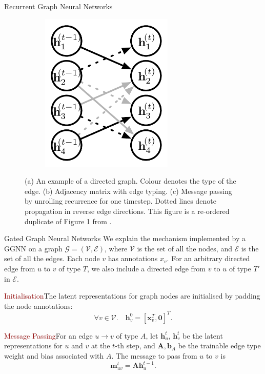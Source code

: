 \documentclass[final,hyperref={pdfpagelabels=false}]{beamer}
\begin{document}
\begin{frame}[t]
\begin{columns}[t]
\begin{column}{.3\textwidth}
\begin{block}{Recurrent Graph Neural Networks}
\begin{figure}
\begin{subfigure}{.25\textwidth}
          \includegraphics[height=3in]{imgs/unrolled-graph3.pdf}
          \caption{}
          \label{fig:sub2}
        \end{subfigure}
        
        \caption{(a) An example of a directed graph. Colour denotes the type of the edge. (b) Adjacency matrix with edge typing. (c) Message passing by unrolling recurrence for one timestep. Dotted lines denote propagation in reverse edge directions. This figure is a re-ordered duplicate of Figure 1 from \cite{DBLP:journals/corr/LiTBZ15}.}
        \label{fig:test}
      \end{figure}
      
      
    \end{block}
    
     \vspace{-0.6in} 
    \begin{block}{Gated Graph Neural Networks}
    We explain the mechanism implemented by a GGNN on a graph $\mathcal{G}=(\mathcal{V}, \mathcal{E})$, where $\mathcal{V}$ is the set of all the nodes, and $\mathcal{E}$ is the set of all the edges. Each node $v$ has annotations $x_v$. For an arbitrary directed edge from $u$ to $v$ of type $T$, we also include a directed edge from $v$ to $u$ of type $T'$ in $\mathcal{E}$.
    \vspace{0.2in}
    
    \textcolor{darkred}{Initialisation}\quad The latent representations for graph nodes are initialised by padding the node annotations:
    \begin{equation}
        \forall v \in \mathcal{V}. \quad \mathbf{h}_v^{0} = [\mathbf{x}_v^T, \mathbf{0}]^T.
    \end{equation}
    
    
    \textcolor{darkred}{Message Passing}\quad For an edge $u \to v$ of type $A$, let $\mathbf{h}_u^t$, $\mathbf{h}_v^t$ be the latent representations for $u$ and $v$ at the $t$-th step, and $\mathbf{A}, \mathbf{b}_A$ be the trainable edge type weight and bias associated with $A$. The message to pass from $u$ to $v$ is
    \begin{equation}
        \mathbf{m}_{uv}^t = \mathbf{A} \mathbf{h}_u^{t-1}.
    \end{equation}
    

\end{block}
\end{column}
\end{columns}
\end{frame}
\end{document}

